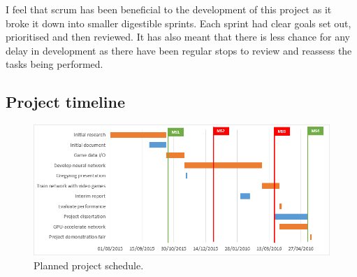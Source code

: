 \documentclass[10pt]{article}
\begin{document}
		I feel that scrum has been beneficial to the development of this project as it broke it down into smaller digestible sprints. Each sprint had clear goals set out, prioritised and then reviewed. It has also meant that there is less chance for any delay in development as there have been regular stops to review and reassess the tasks being performed.
	
	\medskip
	
%	
%	
%	
%	
	
	\subsection{Project timeline}
	
		\begin{figure}[h]				
			\includegraphics[scale=0.6]{img/newSchedule}
			\centering
			\caption{Planned project schedule.}
			\label{fig:newSchedule}
		\end{figure}
		
\end{document}
